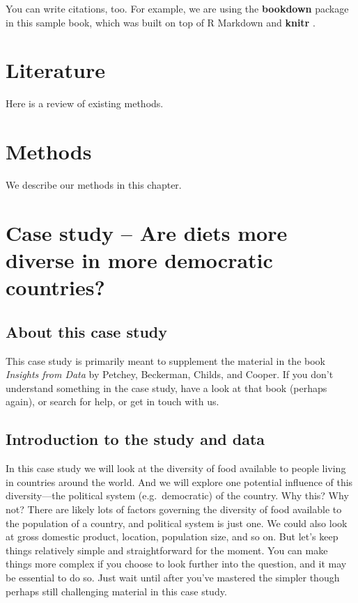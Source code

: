 \documentclass[]{book}
\begin{document}
You can write citations, too. For example, we are using the \textbf{bookdown} package \citep{R-bookdown} in this sample book, which was built on top of R Markdown and \textbf{knitr} \citep{xie2015}.

\hypertarget{literature}{%
\chapter{Literature}\label{literature}}

Here is a review of existing methods.

\hypertarget{methods}{%
\chapter{Methods}\label{methods}}

We describe our methods in this chapter.

\hypertarget{CS3-1}{%
\chapter{Case study -- Are diets more diverse in more democratic countries?}\label{CS3-1}}

\hypertarget{about-this-case-study}{%
\section{About this case study}\label{about-this-case-study}}

This case study is primarily meant to supplement the material in the book \emph{Insights from Data} by Petchey, Beckerman, Childs, and Cooper. If you don't understand something in the case study, have a look at that book (perhaps again), or search for help, or get in touch with us.

\hypertarget{introduction-to-the-study-and-data}{%
\section{Introduction to the study and data}\label{introduction-to-the-study-and-data}}

In this case study we will look at the diversity of food available to people living in countries around the world. And we will explore one potential influence of this diversity---the political system (e.g.~democratic) of the country. Why this? Why not? There are likely lots of factors governing the diversity of food available to the population of a country, and political system is just one. We could also look at gross domestic product, location, population size, and so on. But let's keep things relatively simple and straightforward for the moment. You can make things more complex if you choose to look further into the question, and it may be essential to do so. Just wait until after you've mastered the simpler though perhaps still challenging material in this case study.
\end{document}
